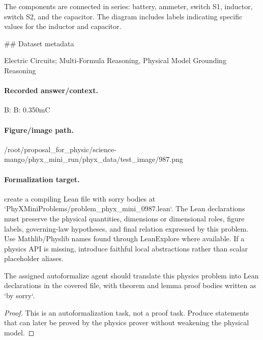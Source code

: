 The components are connected in series: battery, ammeter, switch S1, inductor, switch S2, and the capacitor. The diagram includes labels indicating specific values for the inductor and capacitor.

\#\# Dataset metadata

Electric Circuits; Multi-Formula Reasoning, Physical Model Grounding Reasoning

\paragraph{Recorded answer/context.}
B: B: 0.350mC

\paragraph{Figure/image path.}
/root/proposal\_for\_physic/science-mango/phyx\_mini\_run/phyx\_data/test\_image/987.png

\paragraph{Formalization target.}
create a compiling Lean file with sorry bodies at `PhyXMiniProblems/problem\_phyx\_mini\_0987.lean`. The Lean declarations must preserve the physical quantities, dimensions or dimensional roles, figure labels, governing-law hypotheses, and final relation expressed by this problem.
Use Mathlib/Physlib names found through LeanExplore where available. If a physics API is missing, introduce faithful local abstractions rather than scalar placeholder aliases.

\begin{theorem}
\label{thm:physics:phyx_mini_0987:target}
The assigned autoformalize agent should translate this physics problem into Lean declarations in the covered file, with theorem and lemma proof bodies written as `by sorry`.
\end{theorem}
\begin{proof}
This is an autoformalization task, not a proof task. Produce statements that can later be proved by the physics prover without weakening the physical model.
\end{proof}

